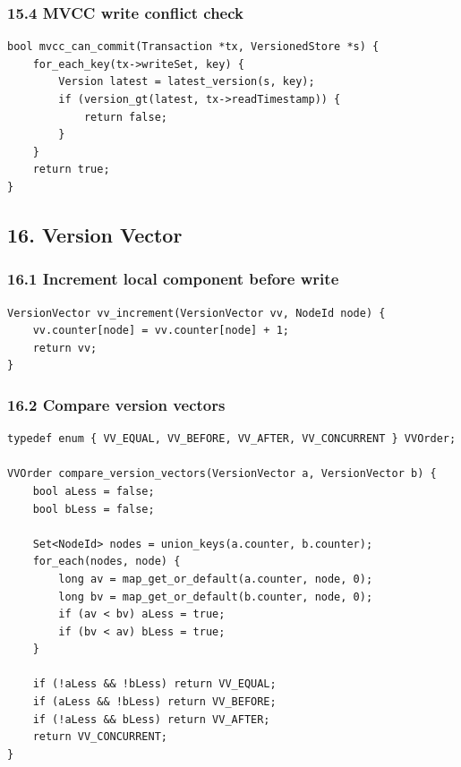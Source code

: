 \documentclass[10pt,letterpaper]{article}
\begin{document}
\subsubsection*{15.4 MVCC write conflict check}

\begin{verbatim}
bool mvcc_can_commit(Transaction *tx, VersionedStore *s) {
    for_each_key(tx->writeSet, key) {
        Version latest = latest_version(s, key);
        if (version_gt(latest, tx->readTimestamp)) {
            return false;
        }
    }
    return true;
}
\end{verbatim}

\subsection*{16. Version Vector}

\subsubsection*{16.1 Increment local component before write}

\begin{verbatim}
VersionVector vv_increment(VersionVector vv, NodeId node) {
    vv.counter[node] = vv.counter[node] + 1;
    return vv;
}
\end{verbatim}

\subsubsection*{16.2 Compare version vectors}

\begin{verbatim}
typedef enum { VV_EQUAL, VV_BEFORE, VV_AFTER, VV_CONCURRENT } VVOrder;

VVOrder compare_version_vectors(VersionVector a, VersionVector b) {
    bool aLess = false;
    bool bLess = false;

    Set<NodeId> nodes = union_keys(a.counter, b.counter);
    for_each(nodes, node) {
        long av = map_get_or_default(a.counter, node, 0);
        long bv = map_get_or_default(b.counter, node, 0);
        if (av < bv) aLess = true;
        if (bv < av) bLess = true;
    }

    if (!aLess && !bLess) return VV_EQUAL;
    if (aLess && !bLess) return VV_BEFORE;
    if (!aLess && bLess) return VV_AFTER;
    return VV_CONCURRENT;
}
\end{verbatim}
\end{document}
